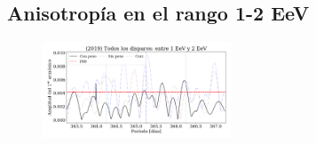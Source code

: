 \subsection{Anisotropía en el rango 1-2 EeV}

\begin{figure}[htbp]
	\centering
	\includegraphics[width=0.5\textwidth]{ani_corr.png}
\end{figure}



